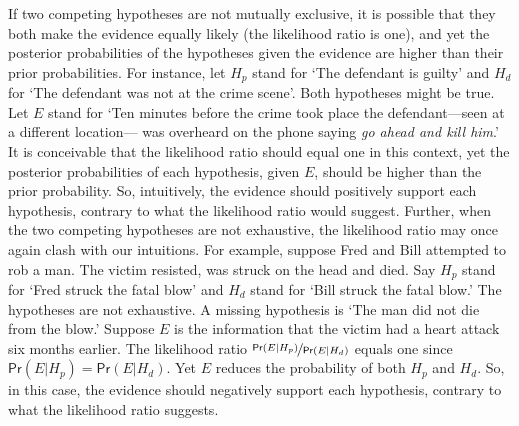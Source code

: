 \documentclass{article}
\newcommand{\pr}{\mathsf{Pr}}
\begin{document}
If two competing hypotheses %
are not mutually exclusive, it is possible that %
they both make the evidence equally likely
(the likelihood ratio is one), and yet the posterior probabilities of the hypotheses given the evidence are higher than their prior probabilities.  For instance, let $H_p$ stand for `The defendant is guilty' and $H_d$ for `The defendant was not at the crime scene'. Both hypotheses might be true. %
Let $E$ stand for `Ten minutes before the crime took place the defendant---seen at a different location--- was overheard on the phone saying \emph{go ahead and kill him}.' 
It is conceivable that the likelihood ratio should equal one in this context, yet the posterior probabilities of each hypothesis, given $E$, should be higher than the prior probability. So, intuitively, the evidence should positively support each hypothesis, contrary to what the likelihood ratio would suggest. 
%
Further, when the two competing hypotheses are not exhaustive, the likelihood ratio may once again clash with our intuitions. 
For example, suppose Fred and Bill attempted to rob a man. The victim resisted, was struck on the head and died. Say $H_p$ stand for `Fred struck the fatal blow' and $H_d$ stand for `Bill struck the fatal blow.' The hypotheses are not exhaustive. A missing hypothesis is  `The man did not die from the blow.' Suppose $E$ is the information that the victim had a heart attack six months earlier. The likelihood ratio $\nicefrac{\pr(E \vert H_p)}{\pr(E \vert H_d)}$  equals one since  $\pr(E\vert H_p)=\pr(E\vert H_d)$. Yet $E$ reduces the probability of both $H_p$ and $H_d$. So, in this case, the evidence should negatively support each hypothesis, contrary to what the likelihood ratio suggests.  
\end{document}
